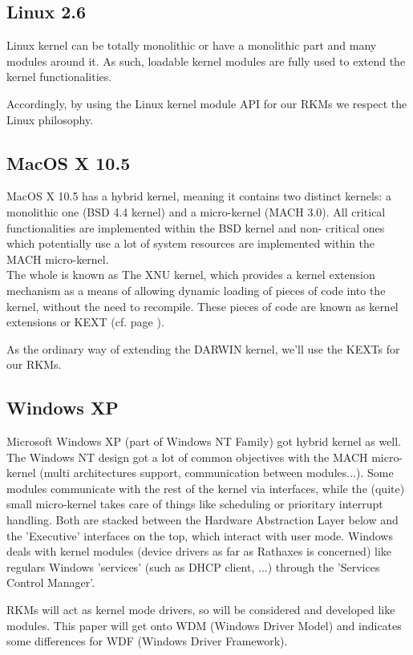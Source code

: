 \documentclass[11pt]{report}
\begin{document}
  \subsection{Linux 2.6}
Linux kernel can be totally monolithic or have a monolithic part and many modules
around it. As such, loadable kernel modules are fully used to extend the kernel
functionalities.

Accordingly, by using the Linux kernel module API for our RKMs we respect the
Linux philosophy.

  \subsection{MacOS X 10.5}
MacOS X 10.5 has a hybrid kernel, meaning it contains two distinct kernels:
a monolithic one (BSD 4.4 kernel) and a micro-kernel (MACH 3.0).
All critical functionalities are implemented within the BSD kernel and non-
critical ones which potentially use a lot of system resources are implemented
within the MACH micro-kernel.\\
The whole is known as The XNU kernel, which provides a kernel extension
mechanism as a means of allowing dynamic loading of pieces of code into the
kernel, without the need to recompile.
These pieces of code are known as kernel extensions or KEXT (cf. page \pageref{KEXT}).

As the ordinary way of extending the DARWIN kernel, we'll use the KEXTs for
our RKMs.

  \subsection{Windows XP}
Microsoft Windows XP (part of Windows NT Family) got hybrid kernel as well.
The Windows NT design got a lot of common objectives with
the MACH micro-kernel (multi architectures support, communication
between modules...).
Some modules communicate with the rest of the kernel via interfaces,
while the (quite) small micro-kernel takes care of things like
scheduling or prioritary interrupt handling. Both are stacked between
the Hardware Abstraction Layer below and the 'Executive' interfaces
on the top, which interact with user mode.
Windows deals with kernel modules (device drivers as far as Rathaxes
is concerned) like regulars Windows 'services' (such as DHCP client, ...)
through the 'Services Control Manager'.

RKMs will act as kernel mode drivers, so will be considered and developed 
like modules.
This paper will get onto WDM (Windows Driver Model) and indicates some
differences for WDF (Windows Driver Framework).
\end{document}
